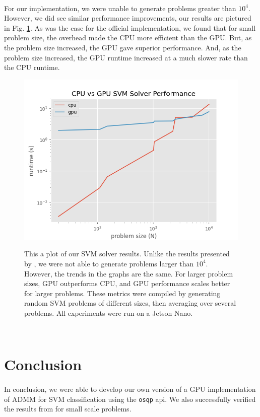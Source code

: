 \documentclass[justified,nobib]{tufte-handout}
\begin{document}
\begin{fullwidth}
\paragraph{} For our implementation, we were unable to generate problems greater than $10^4$. However, we did see similar performance improvements, our results are pictured in Fig. \ref{fig:results}. As was the case for the official implementation, we found that for small problem size, the overhead made the CPU more efficient than the GPU. But, as the problem size increased, the GPU gave superior performance. And, as the problem size increased, the GPU runtime increased at a much slower rate than the CPU runtime. 
\begin{figure}[h]
\includegraphics[scale=.6]{./media/results.png}
\label{fig:results}
\caption{This a plot of our SVM solver results. Unlike the results presented by \cite{cuosqp}, we were not able to generate problems larger than $10^4$. However, the trends in the graphs are the same. For larger problem sizes, GPU outperforms CPU, and GPU performance scales better for larger problems. These metrics were compiled by generating random SVM problems of different sizes, then averaging over several problems. All experiments were run on a Jetson Nano.}
\end{figure}\\

\section{Conclusion}

\paragraph{} In conclusion, we were able to develop our own version of a GPU implementation of ADMM for SVM classification using the \texttt{osqp} api. We also successfully verified the results from \cite{cuosqp} for small scale problems. 
\clearpage
{}

\clearpage

\end{fullwidth}
\end{document}
